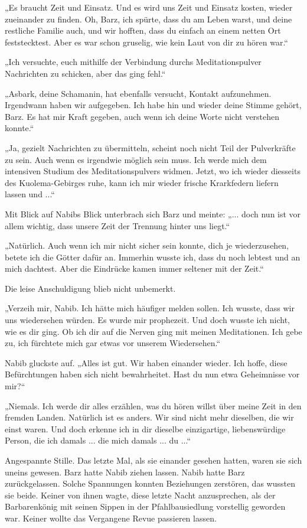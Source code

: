 „Es braucht Zeit und Einsatz. Und es wird uns Zeit und Einsatz kosten, wieder zueinander zu finden. Oh, Barz, ich spürte, dass du am Leben warst, und deine restliche Familie auch, und wir hofften, dass du einfach an einem netten Ort feststecktest. Aber es war schon gruselig, wie kein Laut von dir zu hören war.“

„Ich versuchte, euch mithilfe der Verbindung durchs Meditationspulver Nachrichten zu schicken, aber das ging fehl.“

„Asbark, deine Schamanin, hat ebenfalls versucht, Kontakt aufzunehmen. Irgendwann haben wir aufgegeben. Ich habe hin und wieder deine Stimme gehört, Barz. Es hat mir Kraft gegeben, auch wenn ich deine Worte nicht verstehen konnte.“

„Ja, gezielt Nachrichten zu übermitteln, scheint noch nicht Teil der Pulverkräfte zu sein. Auch wenn es irgendwie möglich sein muss. Ich werde mich dem intensiven Studium des Meditationspulvers widmen. Jetzt, wo ich wieder diesseits des Kuolema-Gebirges ruhe, kann ich mir wieder frische Krarkfedern liefern lassen und ...“

Mit Blick auf Nabibs Blick unterbrach sich Barz und meinte: „... doch nun ist vor allem wichtig, dass unsere Zeit der Trennung hinter uns liegt.“

„Natürlich. Auch wenn ich mir nicht sicher sein konnte, dich je wiederzusehen, betete ich die Götter dafür an. Immerhin wusste ich, dass du noch lebtest und an mich dachtest. Aber die Eindrücke kamen immer seltener mit der Zeit.“

Die leise Anschuldigung blieb nicht unbemerkt.

„Verzeih mir, Nabib. Ich hätte mich häufiger melden sollen. Ich wusste, dass wir uns wiedersehen würden. Es wurde mir prophezeit. Und doch wusste ich nicht, wie es dir ging. Ob ich dir auf die Nerven ging mit meinen Meditationen. Ich gebe zu, ich fürchtete mich gar etwas vor unserem Wiedersehen.“

Nabib gluckste auf. „Alles ist gut. Wir haben einander wieder. Ich hoffe, diese Befürchtungen haben sich nicht bewahrheitet. Hast du nun etwa Geheimnisse vor mir?“

„Niemals. Ich werde dir alles erzählen, was du hören willst über meine Zeit in den fremden Landen. Natürlich ist es anders. Wir sind nicht mehr dieselben, die wir einst waren. Und doch erkenne ich in dir dieselbe einzigartige, liebenswürdige Person, die ich damals ... die mich damals ... du ...“

Angespannte Stille. Das letzte Mal, als sie einander gesehen hatten, waren sie sich uneins gewesen. Barz hatte Nabib ziehen lassen. Nabib hatte Barz zurückgelassen. Solche Spannungen konnten Beziehungen zerstören, das wussten sie beide. Keiner von ihnen wagte, diese letzte Nacht anzusprechen, als der Barbarenkönig mit seinen Sippen in der Pfahlbausiedlung vorstellig geworden war. Keiner wollte das Vergangene Revue passieren lassen.

